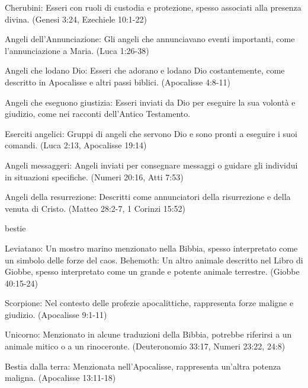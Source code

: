 \documentclass[12pt,a4paper,twoside,openany]{book}
\begin{document}
Cherubini: Esseri con ruoli di custodia e protezione, spesso associati alla presenza divina. (Genesi 3:24, Ezechiele 10:1-22)

Angeli dell'Annunciazione: Gli angeli che annunciavano eventi importanti, come l'annunciazione a Maria. (Luca 1:26-38)

Angeli che lodano Dio: Esseri che adorano e lodano Dio costantemente, come descritto in Apocalisse e altri passi biblici. (Apocalisse 4:8-11)

Angeli che eseguono giustizia: Esseri inviati da Dio per eseguire la sua volontà e giudizio, come nei racconti dell'Antico Testamento.

Eserciti angelici: Gruppi di angeli che servono Dio e sono pronti a eseguire i suoi comandi. (Luca 2:13, Apocalisse 19:14)

Angeli messaggeri: Angeli inviati per consegnare messaggi o guidare gli individui in situazioni specifiche. (Numeri 20:16, Atti 7:53)

Angeli della resurrezione: Descritti come annunciatori della risurrezione e della venuta di Cristo. (Matteo 28:2-7, 1 Corinzi 15:52)

bestie


Leviatano: Un mostro marino menzionato nella Bibbia, spesso interpretato come un simbolo delle forze del caos.
Behemoth: Un altro animale descritto nel Libro di Giobbe, spesso interpretato come un grande e potente animale terrestre. (Giobbe 40:15-24)

Scorpione: Nel contesto delle profezie apocalittiche, rappresenta forze maligne e giudizio. (Apocalisse 9:1-11)

Unicorno: Menzionato in alcune traduzioni della Bibbia, potrebbe riferirsi a un animale mitico o a un rinoceronte. (Deuteronomio 33:17, Numeri 23:22, 24:8)

Bestia dalla terra: Menzionata nell'Apocalisse, rappresenta un'altra potenza maligna. (Apocalisse 13:11-18)
\end{document}
